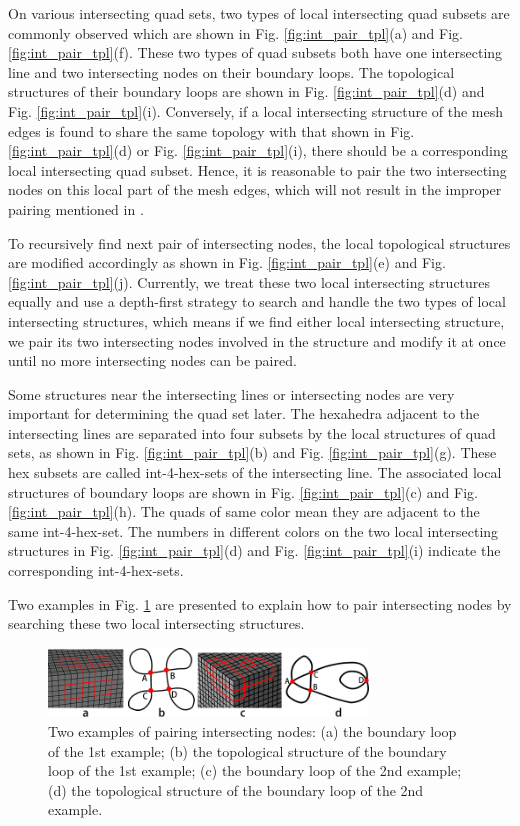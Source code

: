 \documentclass[final,5p,times,twocolumn]{elsarticle}
\begin{document}
On various intersecting quad sets, two types of local intersecting quad subsets are commonly observed which are shown in Fig. \ref{fig:int_pair_tpl}(a) and Fig. \ref{fig:int_pair_tpl}(f). These two types of quad subsets both have one intersecting line and two intersecting nodes on their boundary loops. The topological structures of their boundary loops are shown in Fig. \ref{fig:int_pair_tpl}(d) and Fig. \ref{fig:int_pair_tpl}(i). Conversely, if a local intersecting structure of the mesh edges is found to share the same topology with that shown in Fig. \ref{fig:int_pair_tpl}(d) or Fig. \ref{fig:int_pair_tpl}(i), there should be a corresponding local intersecting quad subset. Hence, it is reasonable to pair the two intersecting nodes on this local part of the mesh edges, which will not result in the improper pairing mentioned in \cite{Suzuki:2010hn}.

To recursively find next pair of intersecting nodes, the local topological structures are modified accordingly as shown in Fig. \ref{fig:int_pair_tpl}(e) and Fig. \ref{fig:int_pair_tpl}(j). Currently, we treat these two local intersecting structures equally and use a depth-first strategy to search and handle the two types of local intersecting structures, which means if we find either local intersecting structure, we pair its two intersecting nodes involved in the structure and modify it at once until no more intersecting nodes can be paired.

Some structures near the intersecting lines or intersecting nodes are very important for determining the quad set later. The hexahedra adjacent to the intersecting lines are separated into four subsets by the local structures of quad sets, as shown in Fig. \ref{fig:int_pair_tpl}(b) and Fig. \ref{fig:int_pair_tpl}(g). These hex subsets are called int-4-hex-sets of the intersecting line. The associated local structures of boundary loops are shown in Fig. \ref{fig:int_pair_tpl}(c) and Fig. \ref{fig:int_pair_tpl}(h). The quads of same color mean they are adjacent to the same int-4-hex-set. The numbers in different colors on the two local intersecting structures in Fig. \ref{fig:int_pair_tpl}(d) and Fig. \ref{fig:int_pair_tpl}(i) indicate the corresponding int-4-hex-sets.

Two examples in Fig. \ref{fig:pair_int_exams} are presented to explain how to pair intersecting nodes by searching these two local intersecting structures.

\begin{figure}[htbp]
\begin{center}
\includegraphics[width=8.5cm]{figures/pmatchexams.png}
\caption{Two examples of pairing intersecting nodes: (a) the boundary loop of the 1st example; (b) the topological structure of the boundary loop of the 1st example; (c) the boundary loop of the 2nd example; (d) the topological structure of the boundary loop of the 2nd example.}
\label{fig:pair_int_exams}
\end{center}
\end{figure}
\end{document}
